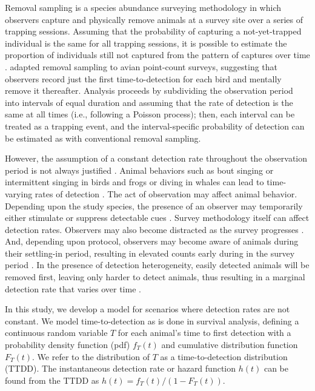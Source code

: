 \documentclass[useAMS,usenatbib,referee,12pt]{article}
\begin{document}
Removal sampling is a species abundance surveying methodology in which observers capture and physically remove animals at a survey site over a series of trapping sessions.  
Assuming that the probability of capturing a not-yet-trapped individual is the same for all trapping sessions, it is possible to estimate the proportion of individuals still not captured from the pattern of captures over time \citep{Moran1951, Zippin1958, Seber1982}.  
\citet{Farnsworth2002} adapted removal sampling to avian point-count surveys, suggesting that observers record just the first time-to-detection for each bird and mentally remove it thereafter.  
Analysis proceeds by subdividing the observation period into intervals of equal duration and assuming that the rate of detection is the same at all times (i.e., following a Poisson process); then, each interval can be treated as a trapping event, and the interval-specific probability of detection can be estimated as with conventional removal sampling.

However, the assumption of a constant detection rate throughout the observation period is not always justified \citep{Alldredge2007}.  
Animal behaviors such as bout singing or intermittent singing in birds and frogs or diving in whales can lead to time-varying rates of detection \citep{Scott2005, Diefenbach2007, Reidy2011}.  
The act of observation may affect animal behavior.  
Depending upon the study species, the presence of an observer may temporarily either stimulate or suppress detectable cues \citep{McSheaRappole1997, Rosenstock2002, Alldredge2007}.  
Survey methodology itself can affect detection rates.  
Observers may also become distracted as the survey progresses \citep{Johnson2008}.  
And, depending upon protocol, observers may become aware of animals during their settling-in period, resulting in elevated counts early during in the survey period \citep{LeeMarsden2008}.  
In the presence of detection heterogeneity, easily detected animals will be removed first, leaving only harder to detect animals, thus resulting in a marginal detection rate that varies over time \citep{Farnsworth2005}.

In this study, we develop a model for scenarios where detection rates are not constant.  
We model time-to-detection as is done in survival analysis, defining a continuous random variable $T$ for each animal's time to first detection with a probability density function (pdf) $f_T(t)$ and cumulative distribution function $F_T(t)$.  
We refer to the distribution of $T$ as a time-to-detection distribution (TTDD).  
The instantaneous detection rate or hazard function $h(t)$ can be found from the TTDD as $h(t) = f_T(t) / (1-F_T(t))$.
\end{document}
